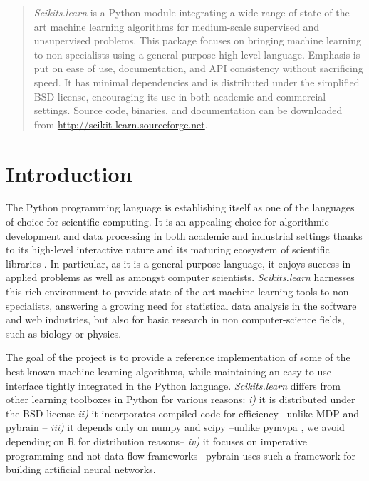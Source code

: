 \documentclass[twoside,11pt]{article}
\begin{document}

\maketitle

\begin{abstract} 
%
\emph{Scikits.learn} is a Python module integrating a wide range of
state-of-the-art machine learning algorithms for medium-scale supervised
and unsupervised problems. This package focuses on bringing machine
learning to non-specialists using a general-purpose high-level language.
Emphasis is put on ease of use, documentation, and API consistency
without sacrificing speed.
%
It has minimal dependencies and is distributed under the simplified BSD
license, encouraging its use in both academic and commercial settings.
Source code, binaries, and documentation can be downloaded from
\url{http://scikit-learn.sourceforge.net}.

\end{abstract}





\section{Introduction}

The Python programming language is establishing itself as one of the
languages of choice for scientific computing. It is an appealing choice 
for algorithmic development and data processing in both academic and 
industrial settings thanks to its high-level interactive
nature and its maturing ecosystem of scientific libraries
\citep{cise2007,cise2011}.
In particular, as it is a general-purpose language, it enjoys success in
applied problems as well as amongst computer scientists.
%
{\sl Scikits.learn} harnesses this rich environment to provide
state-of-the-art machine learning tools to non-specialists, answering a
growing need for statistical data analysis in the software and web
industries, but also for basic research in non computer-science fields,
such as biology or physics.

The goal of the project is to provide a reference implementation of some
of the best known machine learning algorithms, while maintaining an
easy-to-use interface tightly integrated in the Python language.
\emph{Scikits.learn} differs from other learning toolboxes in Python for
various reasons: \emph{i)} it is distributed under the BSD license
\emph{ii)} it incorporates compiled code for efficiency --unlike MDP
\citep{zito2008} and pybrain \citep{schaul2010}-- \emph{iii)} it depends
only on numpy and scipy --unlike pymvpa \citep{hanke2009}, we avoid depending
on R for distribution reasons-- \emph{iv)} it focuses on imperative
programming and not data-flow frameworks --pybrain uses such a framework
for building artificial neural networks.
\end{document}
